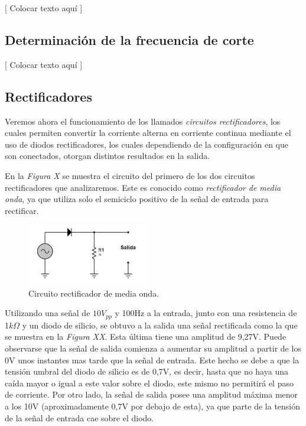 \documentclass{article}
\begin{document}
	[ Colocar texto aquí ]
	\bigskip



\subsection{Determinación de la frecuencia de corte}
	
	[ Colocar texto aquí ]
	\bigskip



\subsection{Rectificadores}
	
	Veremos ahora el funcionamiento de los llamados \textit{circuitos rectificadores}, los cuales permiten convertir la corriente alterna en corriente continua mediante el uso de diodos rectificadores, los cuales dependiendo de la configuración en que son conectados, otorgan distintos resultados en la salida. 
	\par
	En la \textit{Figura X} se muestra el circuito del primero de los dos circuitos rectificadores que analizaremos. Este es conocido como \textit{rectificador de media onda}, ya que utiliza solo el semiciclo positivo de la señal de entrada para rectificar.
\bigskip\bigskip


\begin{figure}[h]
	\centering
	\includegraphics[width=0.47\textwidth]{images/4-4-1-circuito-rectificador-media-onda.jpg}
	\medskip
	\caption{Circuito rectificador de media onda.}
\end{figure}
\bigskip\bigskip


	Utilizando una señal de $10V_{pp}$ y 100Hz a la entrada, junto con una resistencia de 1$k\Omega$ y un diodo de silicio, se obtuvo a la salida una señal rectificada como la que se muestra en la \textit{Figura XX}. Esta última tiene una amplitud de 9,27V. Puede observarse que la señal de salida comienza a aumentar su amplitud a partir de los 0V unos instantes mas tarde que la señal de entrada. Este hecho se debe a que la tensión umbral del diodo de silicio es de 0,7V, es decir, hasta que no haya una caída mayor o igual a este valor sobre el diodo, este mismo no permitirá el paso de corriente. Por otro lado, la señal de salida posee una amplitud máxima menor a los 10V (aproximadamente 0,7V por debajo de esta), ya que parte de la tensión de la señal de entrada cae sobre el diodo.
\bigskip
\end{document}

